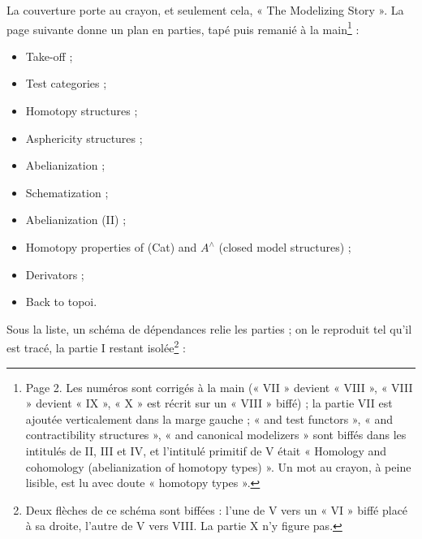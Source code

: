 \documentclass[11pt,a4paper]{article}
\begin{document}
La couverture porte au crayon, et seulement cela, « The Modelizing Story ».
La page suivante donne un plan en parties, tapé puis remanié à la main\footnote{Page 2. Les numéros sont corrigés à la main (« VII » devient
« VIII », « VIII » devient « IX », « X » est récrit sur un « VIII » biffé) ;
la partie VII est ajoutée verticalement dans la marge gauche ; « and test
functors », « and contractibility structures », « and canonical modelizers »
sont biffés dans les intitulés de II, III et IV, et l'intitulé primitif de V
était « Homology and cohomology (abelianization of homotopy types) ». Un mot
au crayon, à peine lisible, est lu avec doute « homotopy types ».} :
\begin{itemize}
  \item[I] Take-off ;
  \item[II] Test categories ;
  \item[III] Homotopy structures ;
  \item[IV] Asphericity structures ;
  \item[V] Abelianization ;
  \item[VI] Schematization ;
  \item[VII] Abelianization (II) ;
  \item[VIII] Homotopy properties of (Cat) and $A^{\wedge}$ (closed model
  structures) ;
  \item[IX] Derivators ;
  \item[X] Back to topoi.
\end{itemize}
Sous la liste, un schéma de dépendances relie les parties ; on le reproduit
tel qu'il est tracé, la partie I restant isolée\footnote{Deux flèches de ce schéma sont biffées : l'une de V vers un « VI »
biffé placé à sa droite, l'autre de V vers VIII. La partie X n'y figure pas.} :

\end{document}
